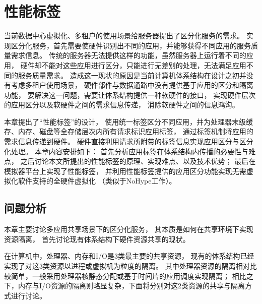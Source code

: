 

\chapter{性能标签}
\label{chap:labeladdrspace}

当前数据中心虚拟化、多租户的使用场景给服务器提出了区分化服务的需求。
实现区分化服务，首先需要使硬件识别出不同的应用，并能够获得不同应用的服务质量需求信息。
传统的服务器无法提供这样的功能，虽然服务器上运行着不同的应用，
硬件却不能对这些应用进行区分，只能进行无差别的处理，无法满足应用不同的服务质量需求。
造成这一现状的原因是当前计算机体系结构在设计之初并没有考虑多租户使用场景，
硬件部件与数据通路中没有提供基于应用的区分和隔离功能，
要解决这一问题，需要让体系结构提供一种软硬件的接口，
实现硬件层次的应用区分以及软硬件之间的需求信息传递，
消除软硬件之间的信息鸿沟。

本章提出了``性能标签''的设计，
使用统一标签区分不同应用，并为处理器末级缓存、内存、磁盘等全存储层次内所有请求标识应用标签，
通过标签机制将应用的需求信息传递到硬件。
硬件直接利用请求所附带的标签信息实现应用区分与区分化处理。
本章内容安排如下：
首先分析应用标签在体系结构内传播的必要性与难点，
之后讨论本文所提出的性能标签的原理、实现难点、以及技术优势；
最后在模拟器平台上实现了性能标签，
并利用性能标签提供的应用区分功能实现无需虚拟化软件支持的全硬件虚拟化
（类似于NoHype工作\cite{keller_nohype:_2010}）。

%
%
%
%

\section{问题分析}

本章主要讨论多应用共享场景下的区分化服务，
其本质是如何在共享环境下实现资源隔离，
首先讨论现有体系结构下硬件资源共享的现状。

在计算机中，处理器、内存和I/O是3类最主要的共享资源，
现有的体系结构已经实现了对这3类资源以进程或虚拟机为粒度的隔离。
其中处理器资源的隔离相对比较简单，一般采用处理器核静态分配或基于时间片的应用调度实现隔离；
相比之下，内存与I/O资源的隔离则略显复杂，下面将分别对这2类资源的共享与隔离方式进行讨论。

